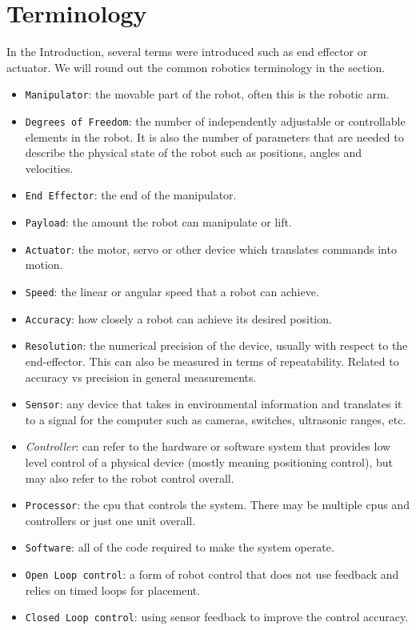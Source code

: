\hypertarget{terminology}{%
\section{Terminology}\label{terminology}}

In the Introduction, several terms were introduced such as end effector
or actuator. We will round out the common robotics terminology in the
section.

\begin{itemize}
\tightlist
\item
  \texttt{Manipulator}: the movable part of the robot, often this is the
  robotic arm.
\item
  \texttt{Degrees\ of\ Freedom}: the number of independently adjustable
  or controllable elements in the robot. It is also the number of
  parameters that are needed to describe the physical state of the robot
  such as positions, angles and velocities.
\item
  \texttt{End\ Effector}: the end of the manipulator.
\item
  \texttt{Payload}: the amount the robot can manipulate or lift.
\item
  \texttt{Actuator}: the motor, servo or other device which translates
  commands into motion.
\item
  \texttt{Speed}: the linear or angular speed that a robot can achieve.
\item
  \texttt{Accuracy}: how closely a robot can achieve its desired
  position.
\item
  \texttt{Resolution}: the numerical precision of the device, usually
  with respect to the end-effector. This can also be measured in terms
  of repeatability. Related to accuracy vs precision in general
  measurements.
\item
  \texttt{Sensor}: any device that takes in environmental information
  and translates it to a signal for the computer such as cameras,
  switches, ultrasonic ranges, etc.
\item
  \emph{Controller}: can refer to the hardware or software system that
  provides low level control of a physical device (mostly meaning
  positioning control), but may also refer to the robot control overall.
\item
  \texttt{Processor}: the cpu that controls the system. There may be
  multiple cpus and controllers or just one unit overall.
\item
  \texttt{Software}: all of the code required to make the system
  operate.
\item
  \texttt{Open\ Loop\ control}: a form of robot control that does not
  use feedback and relies on timed loops for placement.
\item
  \texttt{Closed\ Loop\ control}: using sensor feedback to improve the
  control accuracy.
\end{itemize}

